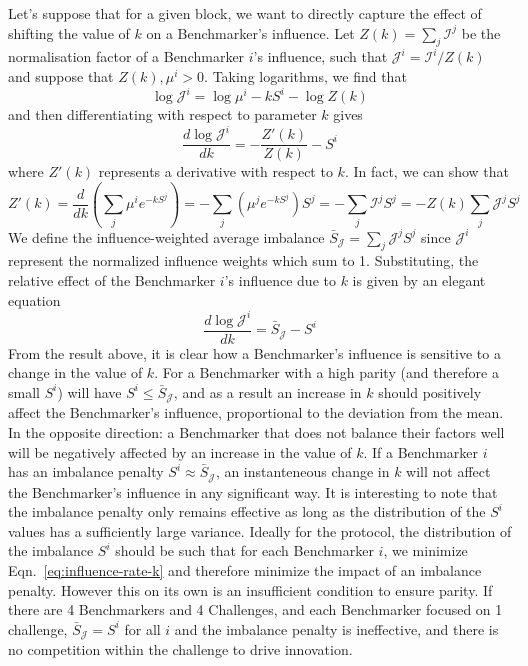 Let's suppose that for a given block, we want to directly capture the effect of shifting the value of $k$ on a Benchmarker's influence.
Let $Z(k) = \sum_{j}\mathcal{I}^j$ be the normalisation factor of a Benchmarker $i$'s influence, such that $\mathcal{J}^i = \mathcal{I}^i/Z(k)$ and suppose that $Z(k), \mu^i > 0$.
Taking logarithms, we find that 
\begin{equation}
    \log\mathcal{J}^i = \log\mu^i - kS^i - \log Z(k)
\end{equation}
and then differentiating with respect to parameter $k$ gives
\begin{equation}
    \frac{d\log\mathcal{J}^i}{d k} = - \frac{Z'(k)}{Z(k)} - S^i
\end{equation}
where $Z'(k)$ represents a derivative with respect to $k$.
In fact, we can show that 
\begin{equation}
    Z'(k) = \frac{d}{dk}\left(\sum_j \mu^i e^{-kS^j}\right) = - \sum_j (\mu^j e^{-kS^j})S^j = - \sum_j \mathcal{I}^j S^j = -Z(k) \sum_j \mathcal{J}^j S^j
\end{equation}
We define the influence-weighted average imbalance $\bar{S}_{\mathcal{J}} = \sum_j \mathcal{J}^j S^j$ since $\mathcal{J}^i$ represent the normalized influence weights which sum to 1. 
Substituting, the relative effect of the Benchmarker $i$'s influence due to $k$ is given by an elegant equation
\begin{equation}
    \frac{d\log\mathcal{J}^i}{dk} = \bar{S}_{\mathcal{J}} - S^i
    \label{eq:influence-rate-k}
\end{equation}
From the result above, it is clear how a Benchmarker's influence is sensitive to a change in the value of $k$. For a Benchmarker with a high parity (and therefore a small $S^i$) will have $S^i \leq \bar{S}_{\mathcal{J}}$, and as a result an increase in $k$ should positively affect the Benchmarker's influence, proportional to the deviation from the mean. 
In the opposite direction: a Benchmarker that does not balance their factors well will be negatively affected by an increase in the value of $k$.
If a Benchmarker $i$ has an imbalance penalty $S^i \approx \bar{S}_{\mathcal{J}}$, an instanteneous change in $k$ will not affect the Benchmarker's influence in any significant way. 
It is interesting to note that the imbalance penalty only remains effective as long as the distribution of the $S^i$ values has a sufficiently large variance.
Ideally for the protocol, the distribution of the imbalance $S^i$ should be such that for each Benchmarker $i$, we minimize Eqn.~\ref{eq:influence-rate-k} and therefore minimize the impact of an imbalance penalty.
However this on its own is an insufficient condition to ensure parity.
If there are 4 Benchmarkers and 4 Challenges, and each Benchmarker focused on 1 challenge, $\bar{S}_{\mathcal{J}} = S^i$ for all $i$ and the imbalance penalty is ineffective, and there is no competition within the challenge to drive innovation.  

